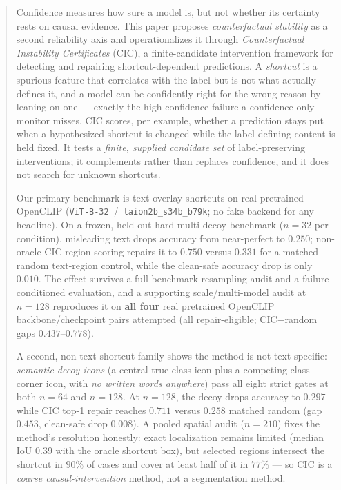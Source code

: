 \documentclass[11pt]{article}
\begin{document}
\clearpage
\thispagestyle{empty}
\begin{abstract}
\noindent\small
Confidence measures how sure a model is, but not whether its certainty rests on
causal evidence. This paper proposes \emph{counterfactual stability} as a second
reliability axis and operationalizes it through \emph{Counterfactual Instability
Certificates} (CIC), a finite-candidate intervention framework for detecting and
repairing shortcut-dependent predictions. A \emph{shortcut} is a spurious feature
that correlates with the label but is not what actually defines it, and a model can
be confidently right for the wrong reason by leaning on one --- exactly the
high-confidence failure a confidence-only monitor misses. CIC scores, per example,
whether a prediction stays put when a hypothesized shortcut is changed while the
label-defining content is held fixed. It tests a \emph{finite, supplied candidate
set} of label-preserving interventions; it complements rather than replaces
confidence, and it does not search for unknown shortcuts.

Our primary benchmark is text-overlay shortcuts on real pretrained OpenCLIP
(\texttt{ViT-B-32}~/~\texttt{laion2b\_s34b\_b79k}; no fake backend for any
headline). On a frozen, held-out hard multi-decoy benchmark ($n=32$ per condition),
misleading text drops accuracy from near-perfect to $0.250$; non-oracle CIC region
scoring repairs it to $0.750$ versus $0.331$ for a matched random text-region
control, while the clean-safe accuracy drop is only $0.010$. The effect survives a
full benchmark-resampling audit and a failure-conditioned evaluation, and a
supporting scale/multi-model audit at $n=128$ reproduces it on \textbf{all four}
real pretrained OpenCLIP backbone/checkpoint pairs attempted (all repair-eligible;
CIC$-$random gaps $0.437$--$0.778$).

A second, non-text shortcut family shows the method is not text-specific:
\emph{semantic-decoy icons} (a central true-class icon plus a competing-class
corner icon, with \emph{no written words anywhere}) pass all eight strict gates at
both $n=64$ and $n=128$. At $n=128$, the decoy drops accuracy to $0.297$ while CIC
top-1 repair reaches $0.711$ versus $0.258$ matched random (gap $0.453$, clean-safe
drop $0.008$). A pooled spatial audit ($n=210$) fixes the method's resolution
honestly: exact localization remains limited (median IoU $0.39$ with the oracle
shortcut box), but selected regions intersect the shortcut in $90\%$ of cases and
cover at least half of it in $77\%$ --- so CIC is a \emph{coarse causal-intervention}
method, not a segmentation method.


\end{abstract}
\end{document}
